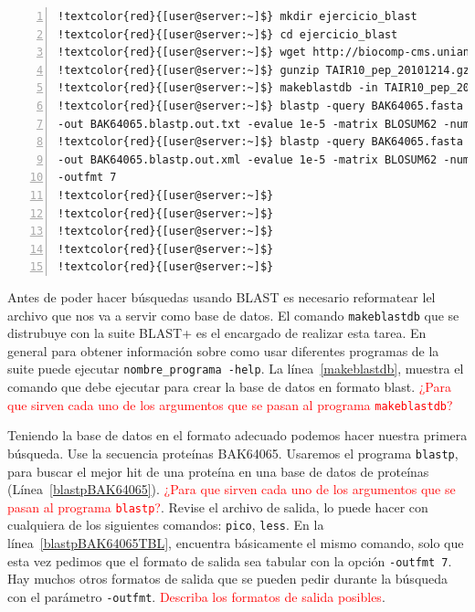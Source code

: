 \documentclass[letter,11pt]{book}
\begin{document}
\begin{Verbatim}[commandchars=!\{\},numbers=left,firstnumber=1,label=Ejecutando Blast+ en CLI,frame=topline,fontsize=\scriptsize]
!textcolor{red}{[user@server:~]$} mkdir ejercicio_blast
!textcolor{red}{[user@server:~]$} cd ejercicio_blast
!textcolor{red}{[user@server:~]$} wget http://biocomp-cms.uniandes.edu.co/exchange/TAIR10_pep_20101214.gz !label{downTAIRBLASTDB}
!textcolor{red}{[user@server:~]$} gunzip TAIR10_pep_20101214.gz
!textcolor{red}{[user@server:~]$} makeblastdb -in TAIR10_pep_20101214 -dbtype prot -parse_seqids -taxid 3702!label{makeblastdb}
!textcolor{red}{[user@server:~]$} blastp -query BAK64065.fasta -task blastp -db TAIR10_pep_20101214 \\ !label{blastpBAK64065}
-out BAK64065.blastp.out.txt -evalue 1e-5 -matrix BLOSUM62 -num_descriptions 1 -num_alignments 1
!textcolor{red}{[user@server:~]$} blastp -query BAK64065.fasta -task blastp -db TAIR10_pep_20101214 \\!label{blastpBAK64065TBL}
-out BAK64065.blastp.out.xml -evalue 1e-5 -matrix BLOSUM62 -num_descriptions 1 -num_alignments 1 \\
-outfmt 7
!textcolor{red}{[user@server:~]$}
!textcolor{red}{[user@server:~]$}
!textcolor{red}{[user@server:~]$}
!textcolor{red}{[user@server:~]$}
!textcolor{red}{[user@server:~]$}
\end{Verbatim} 

Antes de poder hacer búsquedas usando BLAST es necesario reformatear lel archivo que nos va a servir como base de datos. El comando \Verb+makeblastdb+ que  se distrubuye con la suite BLAST+ es el encargado de realizar esta tarea. En general para obtener información sobre como usar diferentes programas de la suite puede ejecutar \Verb+nombre_programa -help+. La línea~\ref{makeblastdb}, muestra el comando que debe ejecutar para crear la base de datos en formato blast. \textcolor{red}{¿Para que sirven cada uno de los argumentos que se pasan al programa \Verb+makeblastdb+?}

Teniendo la base de datos en el formato adecuado podemos hacer nuestra primera búsqueda. Use la secuencia proteínas BAK64065. Usaremos el programa \Verb+blastp+, para buscar el mejor hit de una proteína en una base de datos de proteínas (Línea~\ref{blastpBAK64065}). \textcolor{red}{¿Para que sirven cada uno de los argumentos que se pasan al programa \Verb+blastp+?}. Revise el archivo de salida, lo puede hacer con cualquiera de los siguientes comandos: \Verb+pico+, \Verb+less+. En la línea~\ref{blastpBAK64065TBL}, encuentra básicamente el mismo comando, solo que esta vez pedimos que el formato de salida sea tabular con la opción \Verb+-outfmt 7+. Hay muchos otros formatos de salida que se pueden pedir durante la búsqueda con el parámetro \Verb+-outfmt+. \textcolor{red}{Describa los formatos de salida posibles}.
\end{document}
